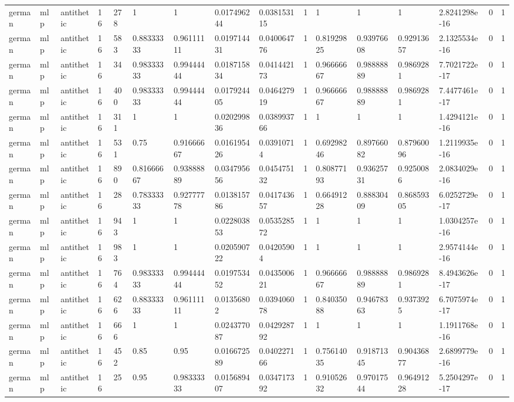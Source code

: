 \begin{tabular}{llllllllllllllll}
german & mlp & antithetic & 16 & 278 & 1 & 1 & 0.017496244 & 0.038153115 & 1 & 1 & 1 & 1 & 2.8241298e-16 & 0 & 1 \\
german & mlp & antithetic & 16 & 583 & 0.88333333 & 0.96111111 & 0.019714431 & 0.040064776 & 1 & 0.81929825 & 0.93976608 & 0.92913657 & 2.1325534e-16 & 0 & 1 \\
german & mlp & antithetic & 16 & 34 & 0.98333333 & 0.99444444 & 0.018715834 & 0.041442173 & 1 & 0.96666667 & 0.98888889 & 0.9869281 & 7.7021722e-17 & 0 & 1 \\
german & mlp & antithetic & 16 & 400 & 0.98333333 & 0.99444444 & 0.017924405 & 0.046427919 & 1 & 0.96666667 & 0.98888889 & 0.9869281 & 7.4477461e-17 & 0 & 1 \\
german & mlp & antithetic & 16 & 311 & 1 & 1 & 0.020299836 & 0.038993766 & 1 & 1 & 1 & 1 & 1.4294121e-16 & 0 & 1 \\
german & mlp & antithetic & 16 & 531 & 0.75 & 0.91666667 & 0.016195426 & 0.03910714 & 1 & 0.69298246 & 0.89766082 & 0.87960096 & 1.2119935e-16 & 0 & 1 \\
german & mlp & antithetic & 16 & 890 & 0.81666667 & 0.93888889 & 0.034795656 & 0.045475132 & 1 & 0.80877193 & 0.93625731 & 0.9250086 & 2.0834029e-16 & 0 & 1 \\
german & mlp & antithetic & 16 & 28 & 0.78333333 & 0.92777778 & 0.013815786 & 0.041743657 & 1 & 0.66491228 & 0.88830409 & 0.86859305 & 6.0252729e-17 & 0 & 1 \\
german & mlp & antithetic & 16 & 943 & 1 & 1 & 0.022803853 & 0.053528572 & 1 & 1 & 1 & 1 & 1.0304257e-16 & 0 & 1 \\
german & mlp & antithetic & 16 & 983 & 1 & 1 & 0.020590722 & 0.04205904 & 1 & 1 & 1 & 1 & 2.9574144e-16 & 0 & 1 \\
german & mlp & antithetic & 16 & 764 & 0.98333333 & 0.99444444 & 0.019753452 & 0.043500621 & 1 & 0.96666667 & 0.98888889 & 0.9869281 & 8.4943626e-17 & 0 & 1 \\
german & mlp & antithetic & 16 & 626 & 0.88333333 & 0.96111111 & 0.01356802 & 0.039406078 & 1 & 0.84035088 & 0.94678363 & 0.9373925 & 6.7075974e-17 & 0 & 1 \\
german & mlp & antithetic & 16 & 666 & 1 & 1 & 0.024377087 & 0.042928792 & 1 & 1 & 1 & 1 & 1.1911768e-16 & 0 & 1 \\
german & mlp & antithetic & 16 & 452 & 0.85 & 0.95 & 0.016672589 & 0.040227166 & 1 & 0.75614035 & 0.91871345 & 0.90436877 & 2.6899779e-16 & 0 & 1 \\
german & mlp & antithetic & 16 & 25 & 0.95 & 0.98333333 & 0.015689407 & 0.034717392 & 1 & 0.91052632 & 0.97017544 & 0.96491228 & 5.2504297e-17 & 0 & 1 \\

\end{tabular}
